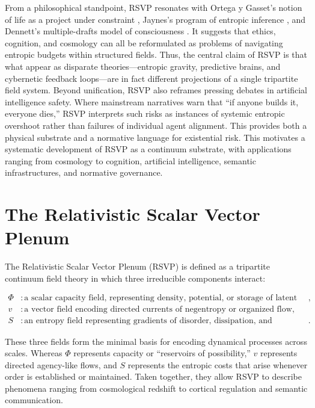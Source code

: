 \documentclass[12pt]{article}
\begin{document}
From a philosophical standpoint, RSVP resonates with Ortega y Gasset’s notion of life as a project under constraint \cite{Ortega1930}, Jaynes’s program of entropic inference \cite{Jaynes2003}, and Dennett’s multiple-drafts model of consciousness \cite{Dennett1991}. It suggests that ethics, cognition, and cosmology can all be reformulated as problems of navigating entropic budgets within structured fields. Thus, the central claim of RSVP is that what appear as disparate theories---entropic gravity, predictive brains, and cybernetic feedback loops---are in fact different projections of a single tripartite field system. Beyond unification, RSVP also reframes pressing debates in artificial intelligence safety. 
Where mainstream narratives warn that ``if anyone builds it, everyone dies,'' RSVP interprets such risks as instances of systemic entropic overshoot rather than failures of individual agent alignment. 
This provides both a physical substrate and a normative language for existential risk. This motivates a systematic development of RSVP as a continuum substrate, with applications ranging from cosmology to cognition, artificial intelligence, semantic infrastructures, and normative governance.

\section{The Relativistic Scalar Vector Plenum}

The Relativistic Scalar Vector Plenum (RSVP) is defined as a tripartite continuum field theory in which three irreducible components interact:  

\begin{align}
\Phi &: \text{a scalar capacity field, representing density, potential, or storage of latent possibility}, \\
v &: \text{a vector field encoding directed currents of negentropy or organized flow}, \\
S &: \text{an entropy field representing gradients of disorder, dissipation, and reorganization}.
\end{align}

These three fields form the minimal basis for encoding dynamical processes across scales. Whereas $\Phi$ represents capacity or “reservoirs of possibility,” $v$ represents directed agency-like flows, and $S$ represents the entropic costs that arise whenever order is established or maintained. Taken together, they allow RSVP to describe phenomena ranging from cosmological redshift to cortical regulation and semantic communication.
\end{document}
